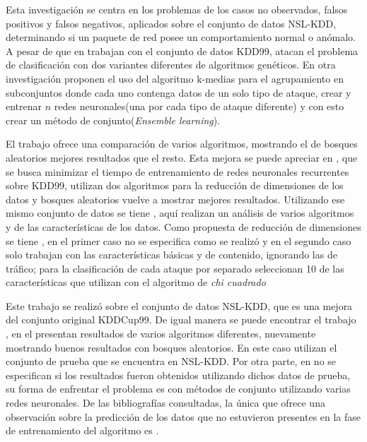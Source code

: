 Esta investigación se centra en los problemas de los casos no observados, falsos positivos y falsos negativos, aplicados sobre el conjunto de datos NSL-KDD, determinando si un paquete de red posee un comportamiento normal o anómalo. A pesar de que en \cite{goyal2008ga,ahmadi2009intrusion} trabajan con el conjunto de datos KDD99, atacan el problema de clasificación con dos variantes diferentes de algoritmos genéticos. En otra investigación \cite{samrin2018hybrid} proponen el uso del algoritmo k-medias para el agrupamiento en subconjuntos donde cada uno contenga datos de un solo tipo de ataque, crear y entrenar $n$ redes neuronales(una por cada tipo de ataque diferente) y con esto crear un método de conjunto(\textit{Ensemble learning}). 

El trabajo \cite{almseidin2017evaluation} ofrece una comparación de varios algoritmos, mostrando el de bosques aleatorios mejores resultados que el resto. Esta mejora se puede apreciar en \cite{anani2018recurrent}, que se busca minimizar el tiempo de entrenamiento de redes neuronales recurrentes sobre KDD99, utilizan dos algoritmos para la reducción de dimensiones de los datos y bosques aleatorios vuelve a mostrar mejores resultados. Utilizando ese mismo conjunto de datos se tiene \cite{kabanda2019bayesian}, aquí realizan un análisis de varios algoritmos y de las características de los datos. Como propuesta de reducción de dimensiones se tiene \cite{sammany2007artificial,divyasree2018network}, en el primer caso no se especifica como se realizó y en el segundo caso solo trabajan con las características básicas y de contenido, ignorando las de tráfico; para la clasificación de cada ataque por separado seleccionan 10 de las características que utilizan con el algoritmo de \textit{chi cuadrado}

Este trabajo se realizó sobre el conjunto de datos NSL-KDD, que es una mejora del conjunto original KDDCup99. De igual manera se puede encontrar el trabajo \cite{abualkibash2019machine}, en el presentan resultados de varios algoritmos diferentes, nuevamente mostrando buenos resultados con bosques aleatorios. En este caso utilizan el conjunto de prueba que se encuentra en NSL-KDD. Por otra parte, en \cite{ludwig2019applying} no se especifican si los resultados fueron obtenidos utilizando dichos datos de prueba, su forma de enfrentar el problema es con métodos de conjunto utilizando varias redes neuronales. De las bibliografías consultadas, la única que ofrece una observación sobre la predicción de los datos que no estuvieron presentes en la fase de entrenamiento del algoritmo es \cite{abualkibash2019machine}.

